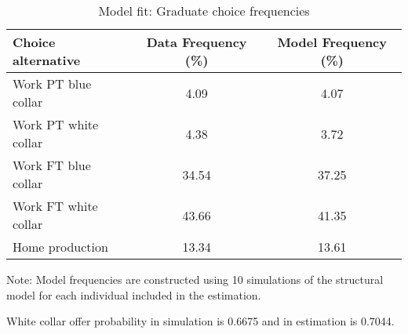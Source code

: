 \clearpage
\begin{table}[ht]
\caption{Model fit: Graduate choice frequencies}
\label{tab:modelfitG}
\centering{}
\begin{threeparttable}
\begin{tabular}{lcc}
\toprule
Choice alternative     & Data Frequency (\%) & Model Frequency (\%)\\
\midrule
Work PT blue collar&4.09&4.07 \\
Work PT white collar&4.38&3.72 \\
Work FT blue collar&34.54&37.25 \\
Work FT white collar&43.66&41.35 \\
Home production&13.34&13.61 \\
\bottomrule
\end{tabular}
\footnotesize Note: Model frequencies are constructed using 10 simulations of the structural model for each individual included in the estimation.

White collar offer probability in simulation is 0.6675 and in estimation is 0.7044.
\end{threeparttable}
\end{table}
